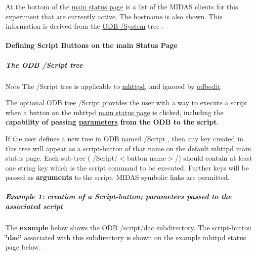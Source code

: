At the bottom of the \hyperlink{RC_mhttpd_Main_Status_page_RC_mhttpd_main_status}{main status page} is a list of the MIDAS clients for this experiment that are currently active. The hostname is also shown. This information is derived from the \hyperlink{RC_Run_States_and_Transitions_RC_odb_system_tree}{ODB /System} tree .

\par
\par


 \par
 \label{index_end}
\hypertarget{index_end}{}
 \paragraph{Defining Script Buttons on the main Status Page}\label{RC_mhttpd_defining_script_buttons}
\par




\label{RC_mhttpd_defining_script_buttons_idx_ODB_tree_Script}
\hypertarget{RC_mhttpd_defining_script_buttons_idx_ODB_tree_Script}{}
 \hypertarget{RC_mhttpd_defining_script_buttons_RC_odb_script_tree}{}\subparagraph{The ODB /Script tree}\label{RC_mhttpd_defining_script_buttons_RC_odb_script_tree}
\begin{DoxyNote}{Note}
The /Script tree is applicable to \hyperlink{RC_mhttpd}{mhttpd}, and ignored by \hyperlink{RC_odbedit}{odbedit}.
\end{DoxyNote}
The optional ODB tree /Script provides the user with a way to execute a script when a button on the mhttpd \hyperlink{RC_mhttpd_Main_Status_page_RC_mhttpd_main_status}{main status page} is clicked, including the {\bfseries capability of passing \hyperlink{structparameters}{parameters} from the ODB to the script}.

\par
 If the user defines a new tree in ODB named /Script , then any key created in this tree will appear as a script-\/button of that name on the default mhttpd main status page. Each sub-\/tree ( /Script/$<$button name$>$/) should contain at least one string key which is the script command to be executed. Further keys will be passed as {\bfseries  arguments } to the script. MIDAS symbolic links are permitted.\hypertarget{RC_mhttpd_defining_script_buttons_RC_odb_script_example1}{}\subparagraph{Example 1: creation of a Script-\/button; parameters passed to the associated script}\label{RC_mhttpd_defining_script_buttons_RC_odb_script_example1}
The {\bfseries  example } below shows the ODB /script/dac subdirectory. The script-\/button {\bfseries \char`\"{}dac\char`\"{}} associated with this subdirectory is shown on the example mhttpd status page below.

